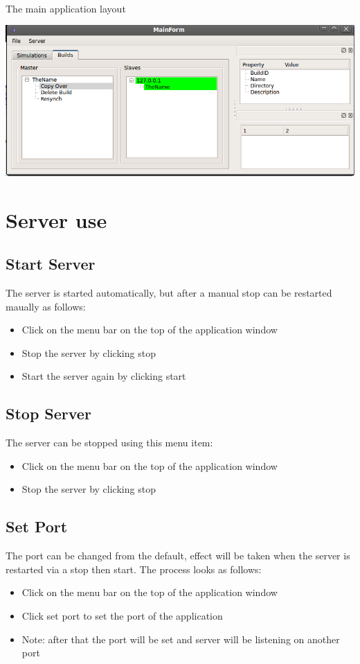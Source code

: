 \documentclass[a4paper,12pt,final]{article}
\begin{document}
\textbf{\\}
The main application layout
\begin{center}
  	\includegraphics[scale=0.4]{MENU.png}
 \end{center}

\section{Server use}

\subsection{Start Server}
The server is started automatically, but after a manual stop can be restarted maually as follows:
\begin{itemize}
\item Click on the menu bar on the top of the application window
\item Stop the server by clicking stop
\item Start the server again by clicking start
\end{itemize}

\subsection{Stop Server}
The server can be stopped using this menu item:
\begin{itemize}
\item Click on the menu bar on the top of the application window
\item Stop the server by clicking stop
\end{itemize}

\subsection{Set Port}
The port can be changed from the default, effect will be taken when the server is restarted via a stop then start. The process looks as follows:
\begin{itemize}
\item Click on the menu bar on the top of the application window
\item Click set port to set the port of the application
\item Note: after that the port will be set and server will be listening on another port
\end{itemize}
\end{document}
